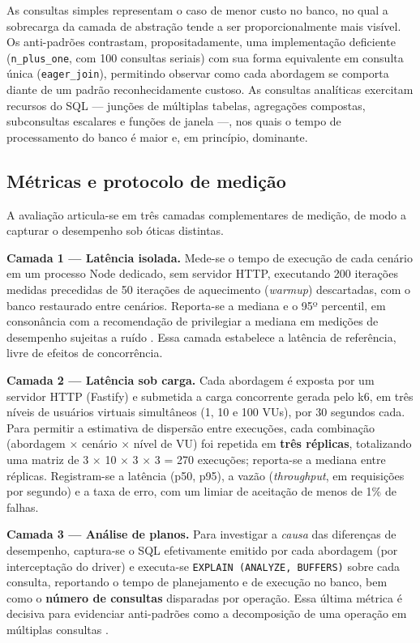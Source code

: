 \documentclass[12pt]{article}
\begin{document}
As consultas simples representam o caso de menor custo no banco, no qual
a sobrecarga da camada de abstração tende a ser proporcionalmente mais
visível. Os anti-padrões contrastam, propositadamente, uma implementação
deficiente (\texttt{n\_plus\_one}, com 100 consultas seriais) com sua
forma equivalente em consulta única (\texttt{eager\_join}), permitindo
observar como cada abordagem se comporta diante de um padrão
reconhecidamente custoso. As consultas analíticas exercitam recursos do
SQL --- junções de múltiplas tabelas, agregações compostas, subconsultas
escalares e funções de janela ---, nos quais o tempo de processamento do
banco é maior e, em princípio, dominante.

\subsection{Métricas e protocolo de medição}

A avaliação articula-se em três camadas complementares de medição, de
modo a capturar o desempenho sob óticas distintas.

\textbf{Camada 1 --- Latência isolada.} Mede-se o tempo de execução de
cada cenário em um processo Node dedicado, sem servidor HTTP, executando
200 iterações medidas precedidas de 50 iterações de aquecimento
(\textit{warmup}) descartadas, com o banco restaurado entre cenários.
Reporta-se a mediana e o 95º percentil, em consonância com a recomendação
de privilegiar a mediana em medições de desempenho sujeitas a ruído
\cite{kalibera2013}. Essa camada estabelece a latência de referência,
livre de efeitos de concorrência.

\textbf{Camada 2 --- Latência sob carga.} Cada abordagem é exposta por um
servidor HTTP (Fastify) e submetida a carga concorrente gerada pelo k6,
em três níveis de usuários virtuais simultâneos (1, 10 e 100 VUs), por 30
segundos cada. Para permitir a estimativa de dispersão entre execuções,
cada combinação (abordagem $\times$ cenário $\times$ nível de VU) foi
repetida em \textbf{três réplicas}, totalizando uma matriz de 3 $\times$
10 $\times$ 3 $\times$ 3 = 270 execuções; reporta-se a mediana entre
réplicas. Registram-se a latência (p50, p95), a vazão
(\textit{throughput}, em requisições por segundo) e a taxa de erro, com um limiar de aceitação de menos de 1\% de
falhas.

\textbf{Camada 3 --- Análise de planos.} Para investigar a \textit{causa}
das diferenças de desempenho, captura-se o SQL efetivamente emitido por
cada abordagem (por interceptação do driver) e executa-se \texttt{EXPLAIN
(ANALYZE, BUFFERS)} sobre cada consulta, reportando o tempo de
planejamento e de execução no banco, bem como o \textbf{número de
consultas} disparadas por operação. Essa última métrica é decisiva para
evidenciar anti-padrões como a decomposição de uma operação em múltiplas
consultas \cite{colley2020}.
\end{document}
